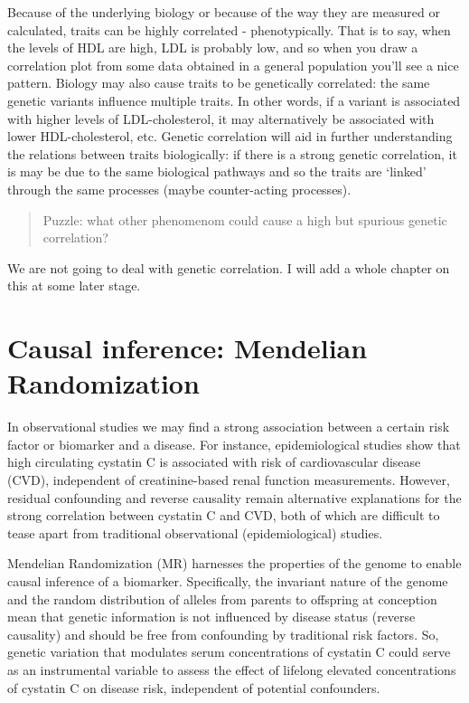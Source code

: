 \documentclass[
]{book}
\begin{document}
Because of the underlying biology or because of the way they are measured or calculated, traits can be highly correlated - phenotypically. That is to say, when the levels of HDL are high, LDL is probably low, and so when you draw a correlation plot from some data obtained in a general population you'll see a nice pattern. Biology may also cause traits to be genetically correlated: the same genetic variants influence multiple traits. In other words, if a variant is associated with higher levels of LDL-cholesterol, it may alternatively be associated with lower HDL-cholesterol, etc. Genetic correlation will aid in further understanding the relations between traits biologically: if there is a strong genetic correlation, it is may be due to the same biological pathways and so the traits are `linked' through the same processes (maybe counter-acting processes).

\begin{quote}
Puzzle: what other phenomenom could cause a high but spurious genetic correlation?
\end{quote}

We are not going to deal with genetic correlation. I will add a whole chapter on this at some later stage.

\hypertarget{causal-inference-mendelian-randomization}{%
\section{Causal inference: Mendelian Randomization}\label{causal-inference-mendelian-randomization}}

In observational studies we may find a strong association between a certain risk factor or biomarker and a disease. For instance, epidemiological studies show that high circulating cystatin C is associated with risk of cardiovascular disease (CVD), independent of creatinine-based renal function measurements\citep{vanderlaan2016}. However, residual confounding and reverse causality remain alternative explanations for the strong correlation between cystatin C and CVD, both of which are difficult to tease apart from traditional observational (epidemiological) studies.

Mendelian Randomization (MR) harnesses the properties of the genome to enable causal inference of a biomarker. Specifically, the invariant nature of the genome and the random distribution of alleles from parents to offspring at conception mean that genetic information is not influenced by disease status (reverse causality) and should be free from confounding by traditional risk factors\citep{vanderlaan2016}. So, genetic variation that modulates serum concentrations of cystatin C could serve as an instrumental variable to assess the effect of lifelong elevated concentrations of cystatin C on disease risk, independent of potential confounders\citep{vanderlaan2016}.
\end{document}
